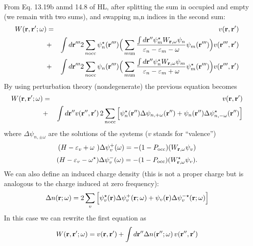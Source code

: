 \documentclass{article}
\def\w{\omega}
\def\E{\varepsilon}
\def\r{{\bf r}}
\def\rp{{\bf r^\prime}}
\def\rpp{{\bf r^{\prime\prime}}}
\def\rppp{{\bf r^{\prime\prime\prime}}}
\begin{document}
From Eq. 13.19b anmd 14.8 of HL, after splitting the sum in occupied and empty
(we remain with two sums), and swapping m,n indices in the second sum:
  \begin{eqnarray}
  W(\r,\rp;\w) & = & v(\r,\rp) \nonumber \\
     & + & \int d\rppp 2\sum_{n{\rm occ}} \psi_n^\star(\rppp) 
       \Big( \sum_{m{\rm un}} \frac{\int d\rpp \psi_m^\star W_{\r,\w} \psi_n}{\E_n-\E_m-\w}\psi_m(\rppp)\Big) v(\rppp,\rp) \nonumber \\
     & + & \int d\rppp 2\sum_{n{\rm occ}} \psi_n(\rppp) 
       \Big( \sum_{m{\rm un}} \frac{\int d\rpp \psi_n^\star W_{\r,\w} \psi_m}{\E_n-\E_m+\w}\psi_m^\star(\rppp)\Big) v(\rppp,\rp) \nonumber \\
  \end{eqnarray}
By using perturbation theory (nondegenerate) the previous equation becomes
  \begin{eqnarray}
  W(\r,\rp;\w) & = & v(\r,\rp) \nonumber \\
    & + & \int d\rpp v(\rpp,\rp) \, 2\sum_{n{\rm occ}} \Big[\psi_n^\star(\rpp) \Delta \psi_{n,+\w}(\rpp) + 
      \psi_n(\rpp) \Delta \psi_{n,-\w}^\star(\rpp) \Big]  \nonumber 
  \end{eqnarray}
where $\Delta \psi_{n,\pm\w}$ are the solutions of the systems ($v$ stands for ``valence'')
  \begin{equation}
  (H-\E_v+\w\phantom{i}) \Delta \psi_v^+(\w) = -(1-P_{\rm occ}) ( W_{\r,\w} \psi_v )
  \end{equation}
  \begin{equation}
  (H-\E_v-\w^\star) \Delta \psi_v^-(\w) = -(1-P_{\rm occ}) ( W^\star_{\r,\w} \psi_v ).
  \end{equation}
We can also define an induced charge density (this is not a proper charge but is analogous
to the charge induced at zero frequency):
  \begin{equation}
  \Delta n (\r;\w) = 2\sum_v \Big[\psi_v^\star(\r) \Delta \psi_v^+(\r;\w) +
      \psi_v(\r) \Delta \psi_v^{-\star}(\r;\w) \Big]
  \end{equation}
In this case we can rewrite the first equation as
  \begin{equation}
  W(\r,\rp;\w) = v(\r,\rp) + \int d\rpp \Delta n (\rpp;\w) \, v(\rpp,\rp)
  \end{equation}
\end{document}
